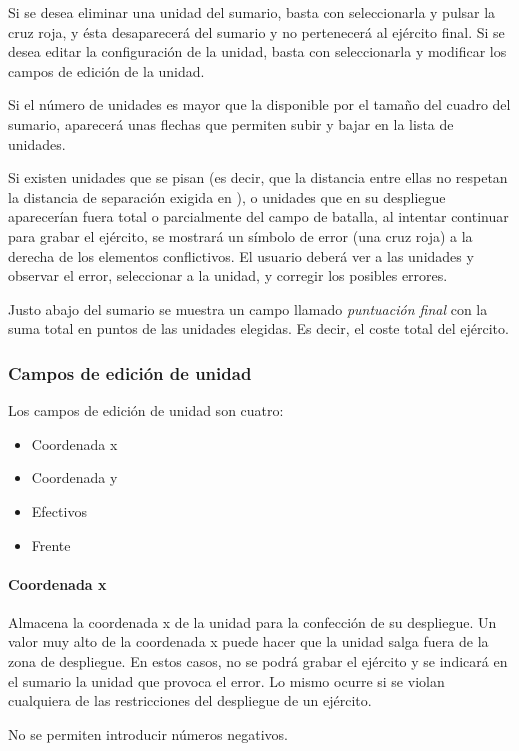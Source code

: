 Si se desea eliminar una unidad del sumario, basta con seleccionarla y
pulsar la cruz roja, y ésta desaparecerá del sumario y no pertenecerá
al ejército final. Si se desea editar la configuración de la unidad,
basta con seleccionarla y modificar los campos de edición de la
unidad.

Si el número de unidades es mayor que la disponible por el tamaño del
cuadro del sumario, aparecerá unas flechas que permiten subir y bajar
en la lista de unidades.

Si existen unidades que se pisan (es decir, que la distancia entre
ellas no respetan la distancia de separación exigida en \gomf), o
unidades que en su despliegue aparecerían fuera total o parcialmente
del campo de batalla, al intentar continuar para grabar el ejército,
se mostrará un símbolo de error (una cruz roja) a la derecha de los
elementos conflictivos. El usuario deberá ver a las unidades y
observar el error, seleccionar a la unidad, y corregir los posibles errores.

Justo abajo del sumario se muestra un campo llamado \emph{puntuación
  final} con la suma total en
puntos de las unidades elegidas. Es decir, el coste total del ejército.

\subsubsection*{Campos de edición de unidad}
Los campos de edición de unidad son cuatro:

\begin{itemize}
\item Coordenada x
\item Coordenada y
\item Efectivos
\item Frente
\end{itemize}

\paragraph{Coordenada x}
Almacena la coordenada x de la unidad para la confección de su
despliegue. Un valor muy alto de la coordenada x puede hacer que la
unidad salga fuera de la zona de despliegue. En estos casos, no se
podrá grabar el ejército y se indicará en el sumario la unidad que
provoca el error. Lo mismo ocurre si se violan cualquiera de las
restricciones del despliegue de un ejército.

No se permiten introducir números negativos.

